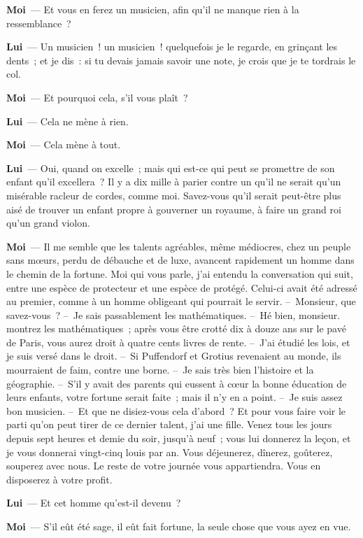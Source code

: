 \documentclass[french,twoside]{book} %
\newcommand{\labelchar}[1]{\textbf{\color{rubric} #1}}
\begin{document}
\labelchar{Moi} — Et vous en ferez un musicien, afin qu’il ne manque rien à la ressemblance ?\par
\labelchar{Lui} — Un musicien ! un musicien ! quelquefois je le regarde, en grinçant les dents ; et je dis : si tu devais jamais savoir une note, je crois que je te tordrais le col.\par
\labelchar{Moi} — Et pourquoi cela, s’il vous plaît ?\par
\labelchar{Lui} — Cela ne mène à rien.\par
\labelchar{Moi} — Cela mène à tout.\par
\labelchar{Lui} — Oui, quand on excelle ; mais qui est-ce qui peut se promettre de son enfant qu’il excellera ? Il y a dix mille à parier contre un qu’il ne serait qu’un misérable racleur de cordes, comme moi. Savez-vous qu’il serait peut-être plus aisé de trouver un enfant propre à gouverner un royaume, à faire un grand roi qu’un grand violon.\par
\labelchar{Moi} — Il me semble que les talents agréables, même médiocres, chez un peuple sans mœurs, perdu de débauche et de luxe, avancent rapidement un homme dans le chemin de la fortune. Moi qui vous parle, j’ai entendu la conversation qui suit, entre une espèce de protecteur et une espèce de protégé. Celui-ci avait été adressé au premier, comme à un homme obligeant qui pourrait le servir. – Monsieur, que savez-vous ? – Je sais passablement les mathématiques. – Hé bien, monsieur. montrez les mathématiques ; après vous être crotté dix à douze ans sur le pavé de Paris, vous aurez droit à quatre cents livres de rente. – J’ai étudié les lois, et je suis versé dans le droit. – Si Puffendorf et Grotius revenaient au monde, ils mourraient de faim, contre une borne. – Je sais très bien l’histoire et la géographie. – S’il y avait des parents qui eussent à cœur la bonne éducation de leurs enfants, votre fortune serait faite ; mais il n’y en a point. – Je suis assez bon musicien. – Et que ne disiez-vous cela d’abord ? Et pour vous faire voir le parti qu’on peut tirer de ce dernier talent, j’ai une fille. Venez tous les jours depuis sept heures et demie du soir, jusqu’à neuf ; vous lui donnerez la leçon, et je vous donnerai vingt-cinq louis par an. Vous déjeunerez, dînerez, goûterez, souperez avec nous. Le reste de votre journée vous appartiendra. Vous en disposerez à votre profit.\par
\labelchar{Lui} — Et cet homme qu’est-il devenu ?\par
\labelchar{Moi} — S’il eût été sage, il eût fait fortune, la seule chose que vous ayez en vue.\par
\end{document}

